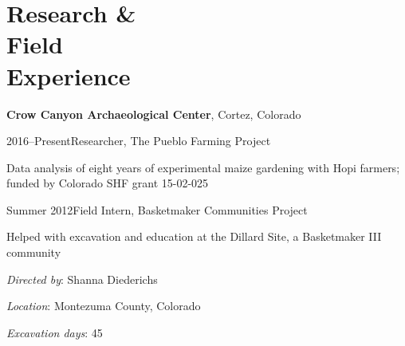 \section{Research \& \\ Field \\ Experience}

%


{\bf Crow Canyon Archaeological Center}, Cortez, Colorado
\begin{list1}
\item[] 2016–Present\hspace{.2cm}Researcher, The Pueblo Farming Project
\begin{list2}
\item[] Data analysis of eight years of experimental maize gardening with Hopi farmers; funded by Colorado SHF grant 15-02-025
\end{list2}
\end{list1}

\vspace{0.1in}

\begin{list1}
\item[] Summer 2012\hspace{.2cm}Field Intern, Basketmaker Communities Project
\begin{list2}
\item[] Helped with excavation and education at the Dillard Site, a Basketmaker III community
\item[] \emph{Directed by}: Shanna Diederichs
\item[] \emph{Location}: Montezuma County, Colorado
\item[] \emph{Excavation days}: 45
\end{list2}
\end{list1}

